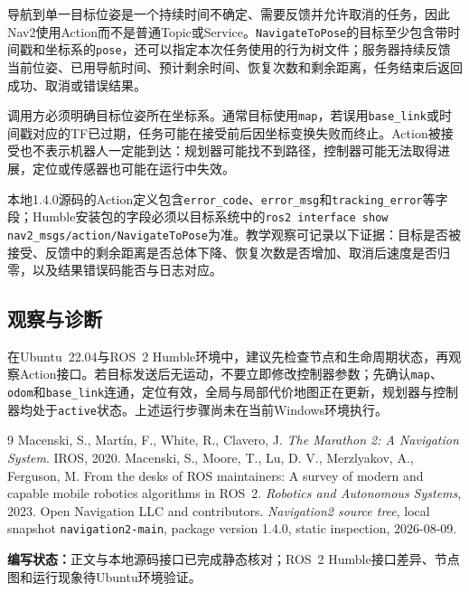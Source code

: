 \documentclass[UTF8,zihao=-4]{ctexart}
\begin{document}
导航到单一目标位姿是一个持续时间不确定、需要反馈并允许取消的任务，因此Nav2使用Action而不是普通Topic或Service。\texttt{NavigateToPose}的目标至少包含带时间戳和坐标系的\texttt{pose}，还可以指定本次任务使用的行为树文件；服务器持续反馈当前位姿、已用导航时间、预计剩余时间、恢复次数和剩余距离，任务结束后返回成功、取消或错误结果\cite{navigation2source}。

调用方必须明确目标位姿所在坐标系。通常目标使用\texttt{map}，若误用\texttt{base\_link}或时间戳对应的TF已过期，任务可能在接受前后因坐标变换失败而终止。Action被接受也不表示机器人一定能到达：规划器可能找不到路径，控制器可能无法取得进展，定位或传感器也可能在运行中失效。

本地1.4.0源码的Action定义包含\texttt{error\_code}、\texttt{error\_msg}和\texttt{tracking\_error}等字段；Humble安装包的字段必须以目标系统中的\texttt{ros2 interface show nav2\_msgs/action/NavigateToPose}为准。教学观察可记录以下证据：目标是否被接受、反馈中的剩余距离是否总体下降、恢复次数是否增加、取消后速度是否归零，以及结果错误码能否与日志对应。

\subsection*{观察与诊断}

在Ubuntu~22.04与ROS~2 Humble环境中，建议先检查节点和生命周期状态，再观察Action接口。若目标发送后无运动，不要立即修改控制器参数；先确认\texttt{map}、\texttt{odom}和\texttt{base\_link}连通，定位有效，全局与局部代价地图正在更新，规划器与控制器均处于\texttt{active}状态。上述运行步骤尚未在当前Windows环境执行。

\begin{thebibliography}{9}
 Macenski, S., Martín, F., White, R., Clavero, J. \emph{The Marathon 2: A Navigation System}. IROS, 2020.
 Macenski, S., Moore, T., Lu, D. V., Merzlyakov, A., Ferguson, M. From the desks of ROS maintainers: A survey of modern and capable mobile robotics algorithms in ROS~2. \emph{Robotics and Autonomous Systems}, 2023.
 Open Navigation LLC and contributors. \emph{Navigation2 source tree}, local snapshot \texttt{navigation2-main}, package version 1.4.0, static inspection, 2026-08-09.
\end{thebibliography}

\noindent\textbf{编写状态：}正文与本地源码接口已完成静态核对；ROS~2 Humble接口差异、节点图和运行现象待Ubuntu环境验证。
\end{document}
